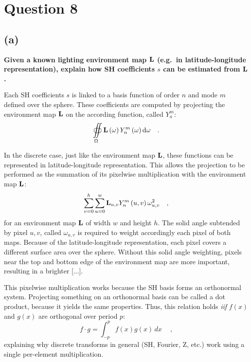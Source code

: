\documentclass{report}
\begin{document}
\section{Question 8}
\subsection{(a)}
\textbf{Given a known lighting environment map $\mathbf{L}$ (e.g.\ in latitude-longitude representation), explain how SH coefficients $s$ can be estimated from $\mathbf{L}$.}

Each SH coefficients $s$ is linked to a basis function of order $n$ and mode $m$ defined over the sphere. These coefficients are computed by projecting the environment map $\mathbf{L}$ on the according function, called $Y_n^m$:
\begin{equation}
\oiint\limits_{\Omega} \mathbf{L}\left(\mathbf{\omega} \right) Y_n^m \left( \mathbf{\omega} \right) \mathrm{d} \mathbf{\omega}   \quad.
\end{equation}

In the discrete case, just like the environment map $\mathbf{L}$, these functions can be represented in latitude-longitude representation. This allows the projection to be performed as the summation of its pixelwise multiplication with the environment map $\mathbf{L}$:
\begin{equation}
\sum_{v=0}^{h} \sum_{u=0}^{w} \mathbf{L}_{u,v} Y_n^m\left(u, v\right) \omega_{u,v}^2 \quad,
\end{equation}
for an environment map $\mathbf{L}$ of width $w$ and height $h$. The solid angle subtended by pixel $u,v$, called $\omega_{u,v}$ is required to weight accordingly each pixel of both maps. Because of the latitude-longitude representation, each pixel covers a different surface area over the sphere. Without this solid angle weighting, pixels near the top and bottom edge of the environment map are more important, resulting in a brighter  [...].



This pixelwise multiplication works because the SH basis forms an orthonormal system. Projecting something on an orthonormal basis can be called a dot product, because it yields the same properties. Thus, this relation holds \emph{iif} $f(x)$ and $g(x)$ are orthogonal over period $p$:
\begin{equation}
f \cdot g=\int_{-p}^p f(x)g(x)\,dx\ \quad,
\end{equation}
explaining why discrete transforms in general (SH, Fourier, Z, etc.) work using a single per-element multiplication.
\end{document}
